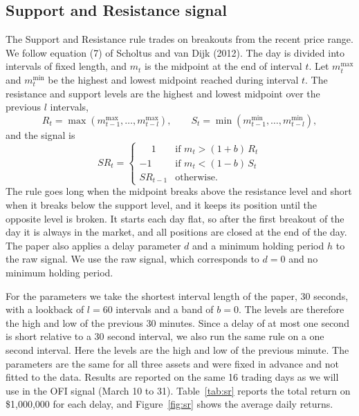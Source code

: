 \documentclass{article}
\begin{document}
\subsection{Support and Resistance signal}
The Support and Resistance rule trades on breakouts from the recent price range. We follow equation (7) of Scholtus and van Dijk (2012). The day is divided into intervals of fixed length, and $m_t$ is the midpoint at the end of interval $t$. Let $m^{\max}_t$ and $m^{\min}_t$ be the highest and lowest midpoint reached during interval $t$. The resistance and support levels are the highest and lowest midpoint over the previous $l$ intervals,
\begin{equation}
R_t = \max(m^{\max}_{t-1}, \dots, m^{\max}_{t-l}), \qquad S_t = \min(m^{\min}_{t-1}, \dots, m^{\min}_{t-l}),
\end{equation}
and the signal is
\begin{equation}
SR_t =
\begin{cases}
\phantom{-}1 & \text{if } m_t > (1+b)\,R_t \\
-1 & \text{if } m_t < (1-b)\,S_t \\
SR_{t-1} & \text{otherwise.}
\end{cases}
\end{equation}
The rule goes long when the midpoint breaks above the resistance level and short when it breaks below the support level, and it keeps its position until the opposite level is broken. It starts each day flat, so after the first breakout of the day it is always in the market, and all positions are closed at the end of the day. The paper also applies a delay parameter $d$ and a minimum holding period $h$ to the raw signal. We use the raw signal, which corresponds to $d = 0$ and no minimum holding period.
 
For the parameters we take the shortest interval length of the paper, 30 seconds, with a lookback of $l = 60$ intervals and a band of $b = 0$. The levels are therefore the high and low of the previous 30 minutes. Since a delay of at most one second is short relative to a 30 second interval, we also run the same rule on a one second interval. Here the levels are the high and low of the previous minute. The parameters are the same for all three assets and were fixed in advance and not fitted to the data. Results are reported on the same 16 trading days as we will use in the OFI signal (March 10 to 31). Table~\ref{tab:sr} reports the total return on \$1,000,000 for each delay, and Figure~\ref{fig:sr} shows the average daily returns.
 
\end{document}
